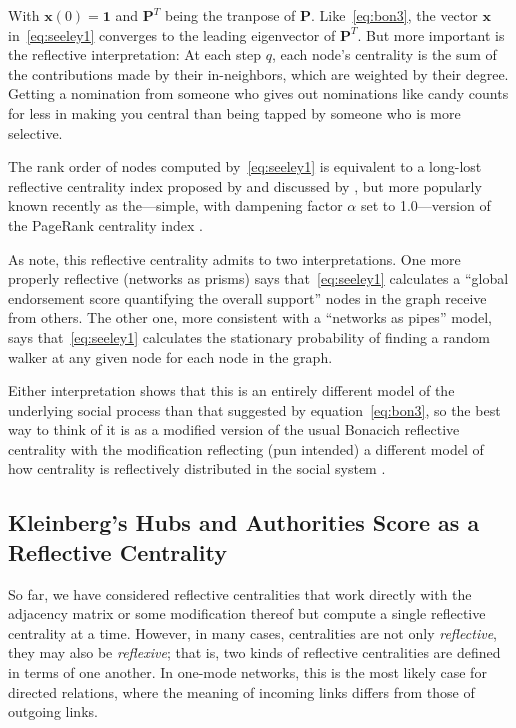 \documentclass[a4paper,fleqn]{cas-sc}
\begin{document}
With $\mathbf{x}(0) = \mathbf{1}$ and $\mathbf{P}^T$ being the tranpose of $\mathbf{P}$. Like~\ref{eq:bon3}, the vector $\mathbf{x}$ in~\ref{eq:seeley1} converges to the leading eigenvector of $\mathbf{P}^T$. But more important is the reflective interpretation: At each step $q$, each node's centrality is the sum of the contributions made by their in-neighbors, which are weighted by their degree. Getting a nomination from someone who gives out nominations like candy counts for less in making you central than being tapped by someone who is more selective. 

The rank order of nodes computed by~\ref{eq:seeley1} is equivalent to a long-lost reflective centrality index proposed by \citet{seeley49} and discussed by \citet{vigna16}, but more popularly known recently as the---simple, with dampening factor $\alpha$ set to 1.0---version of the PageRank centrality index \citep{brinn_page}. 

As \citet[218]{fouss_etal16} note, this reflective centrality admits to two interpretations. One more properly reflective (networks as prisms) says that~\ref{eq:seeley1} calculates a ``global endorsement score quantifying the overall support'' nodes in the graph receive from others. The other one, more consistent with a ``networks as pipes'' model, says that~\ref{eq:seeley1} calculates the stationary probability of finding a random walker at any given node for each node in the graph. 

Either interpretation shows that this is an entirely different model of the underlying social process than that suggested by equation~\ref{eq:bon3}, so the best way to think of it is as a modified version of the usual Bonacich reflective centrality with the modification reflecting (pun intended) a different model of how centrality is reflectively distributed in the social system \citep{seeley49}.

\subsection{Kleinberg's Hubs and Authorities Score as a Reflective Centrality}
So far, we have considered reflective centralities that work directly with the adjacency matrix or some modification thereof but compute a single reflective centrality at a time. However, in many cases, centralities are not only \textit{reflective}, they may also be \textit{reflexive}; that is, two kinds of reflective centralities are defined in terms of one another. In one-mode networks, this is the most likely case for directed relations, where the meaning of incoming links differs from those of outgoing links. 
\end{document}
